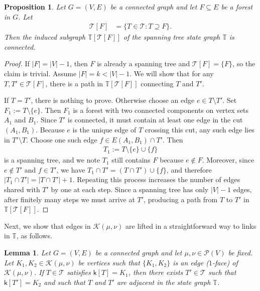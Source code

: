 \documentclass[10pt,a4paper]{amsart}
\newcommand{\prob}{{\mathscr{P}}}
\newcommand{\setoftrees}{{\mathcal{T}}}
\newcommand{\stategraph}{{\mathbb{T}}}
\newcommand{\embedding}{{\mathsf{k}}}
\newcommand{\flowpoly}{{\mathcal{K}}}
\newtheorem{lemma}[theorem]{Lemma}
\newtheorem{proposition}[theorem]{Proposition}
\begin{document}
    \begin{proposition}\label{prop:connected-fibers}
        Let $G=(V,E)$ be a connected graph and let $F\subseteq E$ be a forest in $G$. Let
            \begin{align*}
                \setoftrees[F] &= \{T\in\setoftrees : T\supseteq F\}.
            \end{align*}
        Then the induced subgraph $\stategraph[\setoftrees[F]]$ of the spanning tree state graph $\stategraph$ is connected.
    \end{proposition}

    \begin{proof}
        If $|F|=|V|-1$, then $F$ is already a spanning tree and $\setoftrees[F]=\{F\}$, so the claim is trivial. Assume $|F|=k<|V|-1$. We will show that for any $T,T'\in\setoftrees[F]$, there is a path in $\stategraph[\setoftrees[F]]$ connecting $T$ and $T'$.

        If $T=T'$, there is nothing to prove. Otherwise choose an edge $e\in T\setminus T'$. Set $F_1 := T\setminus\{e\}$. Then $F_1$ is a forest with two connected components on vertex sets $A_1$ and $B_1$. Since $T'$ is connected, it must contain at least one edge in the cut $(A_1,B_1)$. Because $e$ is the unique edge of $T$ crossing this cut, any such edge lies in $T'\setminus T$. Choose one such edge $f\in E(A_1,B_1)\cap T'$. Then
            \begin{align*}
                T_1 := T\setminus\{e\}\cup\{f\}
            \end{align*}
        is a spanning tree, and we note $T_1$ still contains $F$ because $e\notin F$. 
        Moreover, since $e\notin T'$ and $f\in T'$, we have $T_1\cap T' = (T\cap T')\cup\{f\}$, and therefore $|T_1\cap T'| = |T\cap T'|+1$. Repeating this process increases the number of edges shared with $T'$ by one at each step. Since a spanning tree has only $|V|-1$ edges, after finitely many steps we must arrive at $T'$, producing a path from $T$ to $T'$ in $\stategraph[\setoftrees[F]]$.
    \end{proof}

    Next, we show that edges in $\flowpoly(\mu,\nu)$ are lifted in a straightforward way to links in $\stategraph$, as follows.

    \begin{lemma}\label{lem:adjacency-in-K}
        Let $G=(V,E)$ be a connected graph and let $\mu,\nu\in\prob(V)$ be fixed. Let $K_1, K_2\in\flowpoly(\mu,\nu)$ be vertices such that $\{K_1, K_2\}$ is an edge ($1$-face) of $\flowpoly(\mu,\nu)$. If $T \in\setoftrees$ satisfies $\embedding[T] = K_1$, then there exists $T'\in\setoftrees$ such that $\embedding[T'] = K_2$ and such that $T$ and $T'$ are adjacent in the state graph $\stategraph$.
    \end{lemma}
\end{document}

